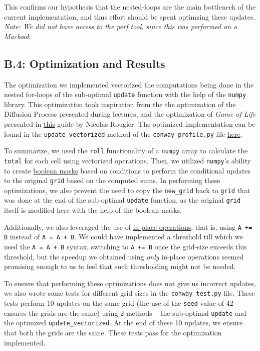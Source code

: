\documentclass[a4paper,12pt]{article}
\begin{document}
This confirms our hypothesis that the nested-loops are the main bottleneck of the current implementation, and thus effort should be spent optimzing these updates. \\
\textit{Note: We did not have access to the perf tool, since this was performed on a Macbook}.

\subsection{B.4: Optimization and Results}
\label{sec:b4}
The optimization we implemented vectorized the computations being done in the nested for-loops of the sub-optimal \verb|update| function with the help of the \verb|numpy| library. This optimization took inspiration from the the optimization of the Diffusion Process presented during lectures, and the optimization of \textit{Game of Life} presented in \href{https://www.labri.fr/perso/nrougier/from-python-to-numpy/}{this} guide by Nicolas Rougier. The optimized implementation can be found in the \verb|update_vectorized| method of the \verb|conway_profile.py| file \href{https://github.com/paulmyr/DD2358-HPC25/blob/master/02_hpcds/bonus/conway_profile.py}{here}.

To summarize, we used the \verb|roll| functionality of a \verb|numpy| array to calculate the \verb|total| for each cell using vectorized operations. Then, we utilized \verb|numpy|'s ability to create \underline{boolean masks} based on conditions to perform the conditional updates to the original \verb|grid| based on the computed sums. In performing these optimizations, we also prevent the need to copy the \verb|new_grid| back to \verb|grid| that was done at the end of the sub-optimal \verb|update| function, as the original \verb|grid| itself is modified here with the help of the boolean-masks. 

Additionally, we also leveraged the use of \underline{in-place operations}, that is, using \verb|A += B| instead of \verb|A = A + B|. We could have implemented a threshold till which we used the \verb|A = A + B| syntax, switching to \verb|A += B| once the grid-size exceeds this threshold, but the speedup we obtained using \textit{only} in-place operations seemed promising enough to us to feel that such thresholding might not be needed. 

To ensure that performing these optimizations does not give us incorrect updates, we also wrote some tests for different grid sizes in the \verb|conway_test.py| file. These tests perform 10 updates on the same grid (the use of the \verb|seed| value of 42 ensures the grids are the same) using 2 methods -- the sub-optimal \verb|update| and the optimized \verb|update_vectorized|. At the end of these 10 updates, we ensure that both the grids are the same. These tests pass for the optimization implemented. 
\end{document}
